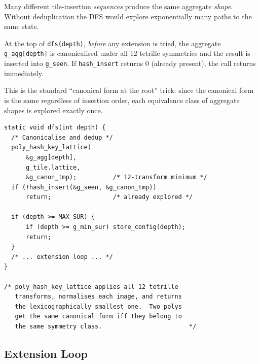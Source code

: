 \documentclass[10pt,a4paper]{article}
\let\polysubsection\subsection
\renewcommand\subsection{\needspace{0.12\textheight}\polysubsection}
\newcommand{\code}[1]{\texttt{\small #1}}
\begin{document}
\begin{tcolorbox}[dualbox, title={State Deduplication via Canonical Hash}]
  Many different tile-insertion \emph{sequences} produce the same
  aggregate \emph{shape}.  Without deduplication the DFS would explore
  exponentially many paths to the same state.

  At the top of \code{dfs(depth)}, \emph{before} any extension is
  tried, the aggregate \code{g\_agg[depth]} is canonicalised under all
  12 tetrille symmetries and the result is inserted into \code{g\_seen}.
  If \code{hash\_insert} returns 0 (already present), the call returns
  immediately.

  This is the standard ``canonical form at the root'' trick: since the
  canonical form is the same regardless of insertion order, each
  equivalence class of aggregate shapes is explored exactly once.
\tcblower
\begin{verbatim}
static void dfs(int depth) {
  /* Canonicalise and dedup */
  poly_hash_key_lattice(
      &g_agg[depth],
      g_tile.lattice,
      &g_canon_tmp);          /* 12-transform minimum */
  if (!hash_insert(&g_seen, &g_canon_tmp))
      return;                 /* already explored */

  if (depth >= MAX_SUR) {
      if (depth >= g_min_sur) store_config(depth);
      return;
  }
  /* ... extension loop ... */
}

/* poly_hash_key_lattice applies all 12 tetrille
   transforms, normalises each image, and returns
   the lexicographically smallest one.  Two polys
   get the same canonical form iff they belong to
   the same symmetry class.                        */
\end{verbatim}
\end{tcolorbox}

\subsection{Extension Loop}
\end{document}
